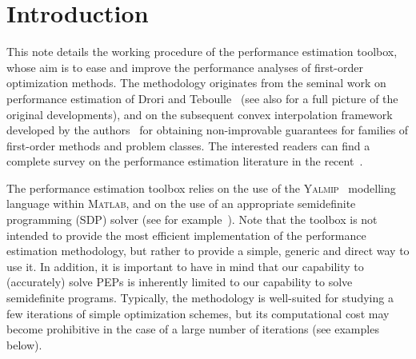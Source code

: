 \documentclass[11pt,a4paper]{article}
\begin{document}
\section{Introduction}			%

This note details the working procedure of the performance estimation toolbox, whose aim is to ease and improve the performance analyses of first-order optimization methods. The methodology originates from the seminal work on performance estimation of Drori and Teboulle~\cite{Article:Drori} (see also \cite{drori2014contributions} for a full picture of the original developments), and on the subsequent convex interpolation framework developed by the authors~\cite{taylor2015smooth,taylor2015exact} for obtaining non-improvable guarantees for families of first-order methods and problem classes. The interested readers can find a complete survey on the performance estimation literature in the recent~\cite{Taylor2017PEPs}.

The performance estimation toolbox relies on the use of the \textsc{Yalmip}~\cite{Article:Yalmip} modelling language within \textsc{Matlab}, and on the use of an appropriate semidefinite programming (SDP) solver (see for example~\cite{Article:Sedumi,Article:Mosek,Article:sdpt3}). Note that the toolbox is not intended to provide the most efficient implementation of the performance estimation methodology, but rather to provide a simple, generic and direct way to use it. In addition, it is important to have in mind that our capability to (accurately) solve PEPs is inherently limited to our capability to solve semidefinite programs. Typically, the methodology is well-suited for studying a few iterations of simple optimization schemes, but its computational cost may become prohibitive in the case of a large number of iterations (see examples below). 
\end{document}
